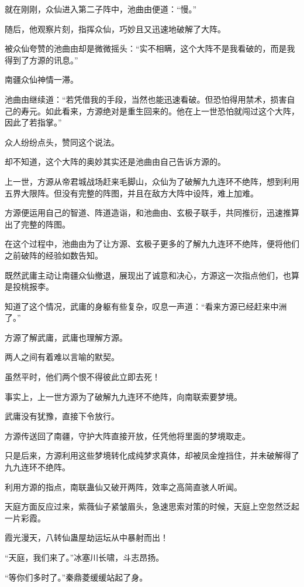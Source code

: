 \begin{this_body}
就在刚刚，众仙进入第二子阵中，池曲由便道：“慢。”

随后，他观察片刻，指挥众仙，巧妙且又迅速地破解了大阵。

被众仙夸赞的池曲由却是微微摇头：“实不相瞒，这个大阵不是我看破的，而是我得到了方源的讯息。”

南疆众仙神情一滞。

池曲由继续道：“若凭借我的手段，当然也能迅速看破。但恐怕得用禁术，损害自己的寿元。如此看来，方源绝对是重生回来的。他在上一世恐怕就闯过这个大阵，因此了若指掌。”

众人纷纷点头，赞同这个说法。

却不知道，这个大阵的奥妙其实还是池曲由自己告诉方源的。

上一世，方源从帝君城战场赶来毛脚山，众仙为了破解九九连环不绝阵，想到利用五界大限阵。但没有完整的阵图，并且在敌方大阵中设阵，难上加难。

方源便运用自己的智道、阵道造诣，和池曲由、玄极子联手，共同推衍，迅速推算出了完整的阵图。

在这个过程中，池曲由为了让方源、玄极子更多的了解九九连环不绝阵，便将他们之前破阵的经验如数告知。

既然武庸主动让南疆众仙撤退，展现出了诚意和决心，方源这一次指点他们，也算是投桃报李。

知道了这个情况，武庸的身躯有些复杂，叹息一声道：“看来方源已经赶来中洲了。”

方源了解武庸，武庸也理解方源。

两人之间有着难以言喻的默契。

虽然平时，他们两个恨不得彼此立即去死！

事实上，上一世方源为了破解九九连环不绝阵，向南联索要梦境。

武庸没有犹豫，直接下令放行。

方源传送回了南疆，守护大阵直接开放，任凭他将里面的梦境取走。

只是后来，方源利用这些梦境转化成纯梦求真体，却被凤金煌挡住，并未破解得了九九连环不绝阵。

利用方源的指点，南联蛊仙又破开两阵，效率之高简直骇人听闻。

天庭方面反应过来，紫薇仙子紧皱眉头，急速思索对策的时候，天庭上空忽然泛起一片彩霞。

霞光漫天，八转仙蛊屋劫运坛从中暴射而出！

“天庭，我们来了。”冰塞川长啸，斗志昂扬。

“等你们多时了。”秦鼎菱缓缓站起了身。

\end{this_body}

